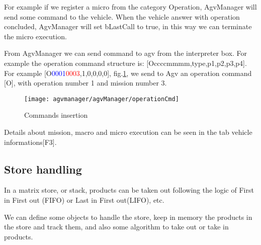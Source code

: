 For example if we register a micro from the category Operation, AgvManager will send some command to the vehicle. When the vehicle answer with operation concluded, AgvManager will set bLastCall to true, in this way we can terminate the micro execution.

From AgvManager we can send command to agv from the interpreter box. For example the operation command structure is: [Occccmmmm,type,p1,p2,p3,p4]. For example [O\textcolor{blue}{0001}\textcolor{red}{0003},1,0,0,0,0], fig.\ref{fig:operationCmd}, we send to Agv an operation command [O], with operation number 1 and mission number 3.

\begin{figure}
	\centering\texttt{[image: agvmanager/agvManager/operationCmd]}
	\caption{Commands insertion}
	\label{fig:operationCmd}
\end{figure}

Details about mission, macro and micro execution can be seen in the tab vehicle informations[F3]. 

%
\subsection{Store handling}
In a matrix store, or stack, products can be taken out following the logic of First in First out (FIFO) or Last in First out(LIFO), etc.

We can define some objects to handle the store, keep in memory the products in the store and track them, and also some algorithm to take out or take in products.


%














